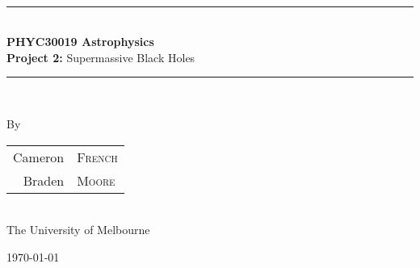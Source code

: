 \documentclass[a4paper]{article} %
\begin{document}
\pagestyle{empty}

\newcommand{\HRule}{\rule{\linewidth}{0.5mm}}

\begin{titlepage}

    \begin{center}
        \textsc{}\\[3cm]

        \HRule \\[0.5cm]
        \Huge \textbf{PHYC30019 Astrophysics}\\[0.5cm]
        \huge \textbf{Project 2:} Supermassive Black Holes\\[0.5cm] 
        \HRule \\[1.5cm]

        \begin{minipage}{0.5\textwidth}
        \begin{center}

		\vspace{3cm}
        \large By \\[0.75cm]
        \begin{tabular}{rl}
        \Large Cameron & \Large \textsc{French} \\ [0.1cm]
        \Large Braden &\Large \textsc{Moore} \\
		\end{tabular}  
		\\[1cm]
        \normalsize \normalfont 
        The University of Melbourne \\[2cm]

        \end{center}
        \end{minipage}

        \vfill

        \large \today
    \end{center}

\newpage
\end{titlepage}
\begin{comment}
\pagestyle{fancy}
\pagenumbering{gobble}
\tableofcontents
\newpage
\end{comment}
\end{document}
